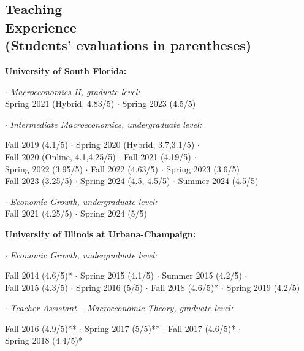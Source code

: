 \documentclass[mm, 10pt]{simple_style}
\begin{document}
\begin{resume}

\section{Teaching\\ Experience \\ {\protect\footnotesize (Students' evaluations in parentheses)}}

\textbf{University of South Florida:}

$\cdot$ \textit{Macroeconomics II, graduate level:} \\
\indent \hspace{1cm} Spring 2021 (Hybrid, 4.83/5) $\cdot$ Spring 2023 (4.5/5)

$\cdot$  \textit{Intermediate Macroeconomics, undergraduate level:}\\
\indent \hspace{1cm}  \begin{minipage}[t]{0.75\textwidth}
Fall 2019 (4.1/5) $\cdot$ Spring 2020 (Hybrid, 3.7,3.1/5) $\cdot$ \\
Fall 2020 (Online, 4.1,4.25/5) $\cdot$ Fall 2021 (4.19/5) $\cdot$ \\
Spring 2022 (3.95/5) $\cdot$ Fall 2022 (4.63/5) $\cdot$ Spring 2023 (3.6/5) \\
Fall 2023 (3.25/5) $\cdot$ Spring 2024 (4.5, 4.5/5) $\cdot$ Summer 2024 (4.5/5)
\end{minipage}

$\cdot$  \textit{Economic Growth, undergraduate level:} \\
\indent \hspace{1cm}  Fall 2021 (4.25/5) $\cdot$ Spring 2024 (5/5)

\textbf{University of Illinois at Urbana-Champaign:}

$\cdot$ \textit{Economic Growth, undergraduate level:} \\
\indent \hspace{1cm}  \begin{minipage}[t]{0.8\textwidth}
Fall 2014 (4.6/5)* $\cdot$ Spring 2015 (4.1/5) $\cdot$ Summer 2015 (4.2/5) $\cdot$ \\
Fall 2015 (4.3/5) $\cdot$ Spring 2016 (5/5) $\cdot$ Fall 2018 (4.6/5)* $\cdot$ Spring 2019 (4.2/5)
\end{minipage}

$\cdot$ \textit{Teacher Assistant -- Macroeconomic Theory, graduate level:} \\
\indent \hspace{1cm}  \begin{minipage}[t]{0.75\textwidth}
Fall 2016 (4.9/5)** $\cdot$ Spring 2017 (5/5)** $\cdot$ Fall 2017 (4.6/5)* $\cdot$ \\
Spring 2018 (4.4/5)*
\end{minipage}


\end{resume}
\end{document}

